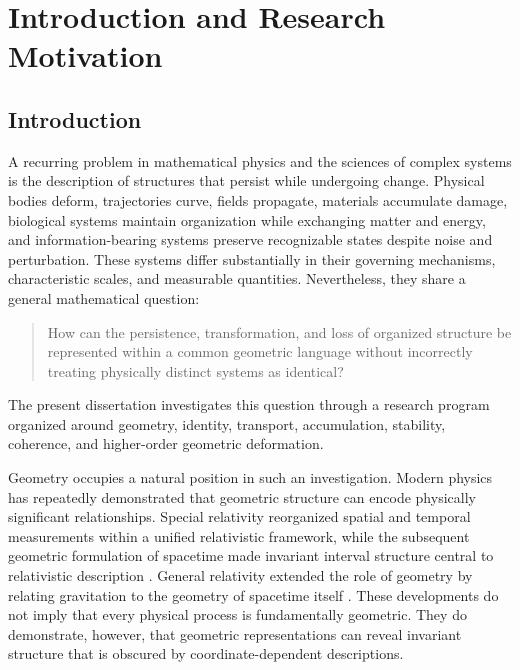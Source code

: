 \documentclass[12pt,oneside]{book}
\begin{document}
\chapter{Introduction and Research Motivation}
\label{chap:introduction}


\section{Introduction}
\label{sec:introduction}

A recurring problem in mathematical physics and the sciences of
complex systems is the description of structures that persist
while undergoing change. Physical bodies deform, trajectories
curve, fields propagate, materials accumulate damage, biological
systems maintain organization while exchanging matter and
energy, and information-bearing systems preserve recognizable
states despite noise and perturbation. These systems differ
substantially in their governing mechanisms, characteristic
scales, and measurable quantities. Nevertheless, they share a
general mathematical question:

\begin{quote}
How can the persistence, transformation, and loss of organized
structure be represented within a common geometric language
without incorrectly treating physically distinct systems as
identical?
\end{quote}

The present dissertation investigates this question through a
research program organized around geometry, identity, transport,
accumulation, stability, coherence, and higher-order geometric
deformation.

Geometry occupies a natural position in such an investigation.
Modern physics has repeatedly demonstrated that geometric
structure can encode physically significant relationships.
Special relativity reorganized spatial and temporal
measurements within a unified relativistic framework, while the
subsequent geometric formulation of spacetime made invariant
interval structure central to relativistic description
\parencite{Einstein1905,Minkowski1909}. General relativity
extended the role of geometry by relating gravitation to the
geometry of spacetime itself \parencite{Einstein1916}. These
developments do not imply that every physical process is
fundamentally geometric. They do demonstrate, however, that
geometric representations can reveal invariant structure that
is obscured by coordinate-dependent descriptions.
\end{document}
